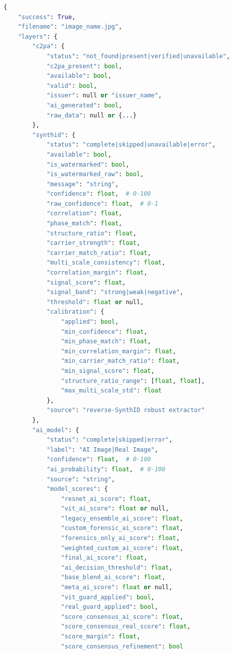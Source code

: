 \documentclass[12pt,a4paper]{book}
\begin{document}
\begin{itemize}
\begin{lstlisting}[language=Python]
{
    "success": True,
    "filename": "image_name.jpg",
    "layers": {
        "c2pa": {
            "status": "not_found|present|verified|unavailable",
            "c2pa_present": bool,
            "available": bool,
            "valid": bool,
            "issuer": null or "issuer_name",
            "ai_generated": bool,
            "raw_data": null or {...}
        },
        "synthid": {
            "status": "complete|skipped|unavailable|error",
            "available": bool,
            "is_watermarked": bool,
            "is_watermarked_raw": bool,
            "message": "string",
            "confidence": float,  # 0-100
            "raw_confidence": float,  # 0-1
            "correlation": float,
            "phase_match": float,
            "structure_ratio": float,
            "carrier_strength": float,
            "carrier_match_ratio": float,
            "multi_scale_consistency": float,
            "correlation_margin": float,
            "signal_score": float,
            "signal_band": "strong|weak|negative",
            "threshold": float or null,
            "calibration": {
                "applied": bool,
                "min_confidence": float,
                "min_phase_match": float,
                "min_correlation_margin": float,
                "min_carrier_match_ratio": float,
                "min_signal_score": float,
                "structure_ratio_range": [float, float],
                "max_multi_scale_std": float
            },
            "source": "reverse-SynthID robust extractor"
        },
        "ai_model": {
            "status": "complete|skipped|error",
            "label": "AI Image|Real Image",
            "confidence": float,  # 0-100
            "ai_probability": float,  # 0-100
            "source": "string",
            "model_scores": {
                "resnet_ai_score": float,
                "vit_ai_score": float or null,
                "legacy_ensemble_ai_score": float,
                "custom_forensic_ai_score": float,
                "forensics_only_ai_score": float,
                "weighted_custom_ai_score": float,
                "final_ai_score": float,
                "ai_decision_threshold": float,
                "base_blend_ai_score": float,
                "meta_ai_score": float or null,
                "vit_guard_applied": bool,
                "real_guard_applied": bool,
                "score_consensus_ai_score": float,
                "score_consensus_real_score": float,
                "score_margin": float,
                "score_consensus_refinement": bool

\end{lstlisting}
\end{itemize}
\end{document}
